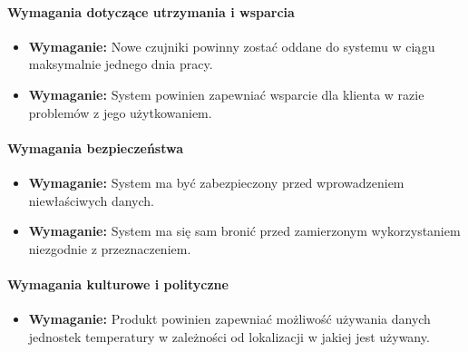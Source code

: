 \documentclass{article}
\begin{document}
\paragraph{Wymagania dotyczące utrzymania i wsparcia}
\begin{itemize}
\item \textbf{Wymaganie:} Nowe czujniki powinny zostać oddane do systemu w ciągu maksymalnie jednego dnia pracy.\\
\end{itemize}
\begin{itemize}
\item \textbf{Wymaganie:} System powinien zapewniać wsparcie dla klienta w razie problemów z jego użytkowaniem.\\
\end{itemize}

\paragraph{Wymagania bezpieczeństwa}
\begin{itemize}
\item \textbf{Wymaganie:} System ma być zabezpieczony przed wprowadzeniem niewłaściwych danych.\\
\end{itemize}
\begin{itemize}
\item \textbf{Wymaganie:} System ma się sam bronić przed zamierzonym wykorzystaniem niezgodnie z przeznaczeniem.\\
\end{itemize}

\paragraph{Wymagania kulturowe i polityczne}
\begin{itemize}
\item \textbf{Wymaganie:} Produkt powinien zapewniać możliwość używania danych jednostek temperatury w zależności od lokalizacji w jakiej jest używany.\\
\end{itemize}
\end{document}
